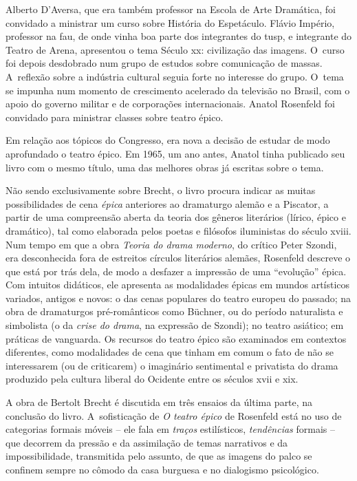 Alberto D'Aversa, que era também professor na Escola de Arte Dramática,
foi convidado a ministrar um curso sobre História do Espetáculo.
Flávio Império, professor na {\sc fau}, de onde vinha boa parte dos
integrantes do {\sc tusp}, e integrante do Teatro de Arena, apresentou o tema
Século {\sc xx}: civilização das imagens. O~curso foi depois
desdobrado num grupo de estudos sobre comunicação de massas. A~reflexão
sobre a indústria cultural seguia forte no interesse do grupo. O~tema se
impunha num momento de crescimento acelerado da televisão no Brasil, com
o apoio do governo militar e de corporações internacionais. Anatol
Rosenfeld foi convidado para ministrar classes sobre teatro épico.

Em relação aos tópicos do Congresso, era nova a decisão de estudar de
modo aprofundado o teatro épico. Em 1965, um ano antes, Anatol
tinha publicado seu livro com o mesmo título, uma das melhores obras já
escritas sobre o tema.

Não sendo exclusivamente sobre Brecht, o livro procura indicar as muitas
possibilidades de cena {\it épica} anteriores ao dramaturgo alemão e a
Piscator, a partir de uma compreensão aberta da teoria dos gêneros
literários (lírico, épico e dramático), tal como elaborada pelos poetas e
filósofos iluministas do século {\sc xviii}. Num tempo em que a obra
{\it Teoria do drama moderno}, do crítico Peter Szondi, era desconhecida
fora de estreitos círculos literários alemães, Rosenfeld descreve o que
está por trás dela, de modo a desfazer a impressão de uma “evolução”
épica. Com intuitos didáticos, ele apresenta as modalidades épicas em
mundos artísticos variados, antigos e novos: o das cenas populares do
teatro europeu do passado; na obra de dramaturgos pré-românticos como
Büchner, ou do período naturalista e simbolista (o da {\it crise do
drama}, na expressão de Szondi); no teatro asiático; em práticas de
vanguarda. Os recursos do teatro épico são examinados em contextos
diferentes, como modalidades de cena que tinham em comum o fato de não
se interessarem (ou de criticarem) o imaginário sentimental e privatista
do drama produzido pela cultura liberal do Ocidente entre os séculos
{\sc xvii} e {\sc xix}.

A obra de Bertolt Brecht é discutida em três ensaios da última parte, na
conclusão do livro. A~sofisticação de {\it O teatro épico} de Rosenfeld
está no uso de categorias formais móveis -- ele fala em {\it traços}
estilísticos, {\it tendências} formais -- que decorrem da pressão e da
assimilação de temas narrativos e da impossibilidade, transmitida pelo
assunto, de que as imagens do palco se confinem sempre no cômodo da casa
burguesa e no dialogismo psicológico.

